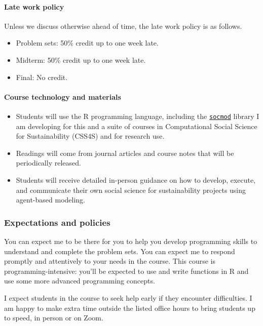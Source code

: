 \documentclass[
  letterpaper,
  DIV=11,
  numbers=noendperiod]{scrartcl}
\let\oldparagraph\paragraph
\renewcommand{\paragraph}[1]{\oldparagraph{#1}\mbox{}}
\providecommand{\tightlist}{%
  \setlength{\itemsep}{0pt}\setlength{\parskip}{0pt}}\usepackage{longtable,booktabs,array}
\begin{document}
\paragraph{Late work policy}\label{late-work-policy}

Unless we discuss otherwise ahead of time, the late work policy is as
follows.

\begin{itemize}
\tightlist
\item
  Problem sets: 50\% credit up to one week late.
\item
  Midterm: 50\% credit up to one week late.
\item
  Final: No credit.
\end{itemize}

\paragraph{Course technology and
materials}\label{course-technology-and-materials}

\begin{itemize}
\tightlist
\item
  Students will use the R programming language, including the
  \href{https://css4s.github.io/socmod/}{\texttt{socmod}} library I am
  developing for this and a suite of courses in Computational Social
  Science for Sustainability (CSS4S) and for research use.
\item
  Readings will come from journal articles and course notes that will be
  periodically released.
\item
  Students will receive detailed in-person guidance on how to develop,
  execute, and communicate their own social science for sustainability
  projects using agent-based modeling.
\end{itemize}

\subsubsection{Expectations and
policies}\label{expectations-and-policies}

You can expect me to be there for you to help you develop programming
skills to understand and complete the problem sets. You can expect me to
respond promptly and attentively to your needs in the course. This
course is programming-intensive: you'll be expected to use and write
functions in R and use some more advanced programming concepts.

I expect students in the course to seek help early if they encounter
difficulties. I am happy to make extra time outside the listed office
hours to bring students up to speed, in person or on Zoom.
\end{document}
